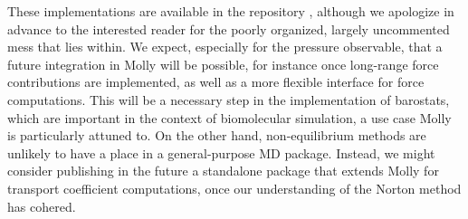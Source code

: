 These implementations are available in the repository \cite{myrepo}, although we apologize in advance to the interested reader for the poorly organized, largely uncommented mess that lies within.
We expect, especially for the pressure observable, that a future integration in Molly will be possible, for instance once long-range force contributions are implemented, as well as a more flexible interface for force computations.
This will be a necessary step in the implementation of barostats, which are important in the context of biomolecular simulation, a use case Molly is particularly attuned to.
On the other hand, non-equilibrium methods are unlikely to have a place in a general-purpose MD package.
Instead, we might consider publishing in the future a standalone package that extends Molly for transport coefficient computations, once our understanding of the Norton method has cohered.